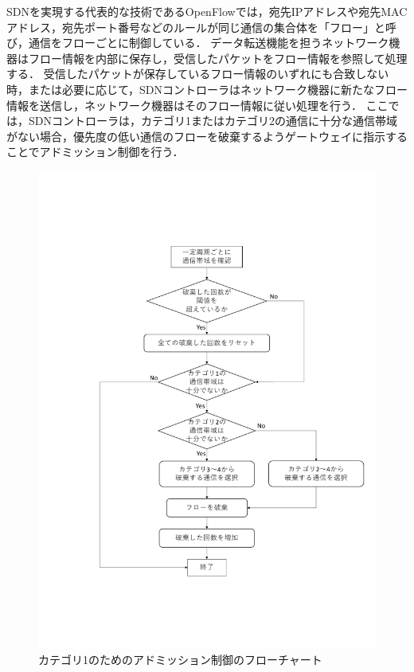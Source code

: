 \documentclass[a4paper,11pt,uplatex]{ujreport}
\begin{document}
  SDNを実現する代表的な技術であるOpenFlowでは，宛先IPアドレスや宛先MACアドレス，宛先ポート番号などのルールが同じ通信の集合体を「フロー」と呼び，通信をフローごとに制御している．
  データ転送機能を担うネットワーク機器はフロー情報を内部に保存し，受信したパケットをフロー情報を参照して処理する．
  受信したパケットが保存しているフロー情報のいずれにも合致しない時，または必要に応じて，SDNコントローラはネットワーク機器に新たなフロー情報を送信し，ネットワーク機器はそのフロー情報に従い処理を行う．
  ここでは，SDNコントローラは，カテゴリ1またはカテゴリ2の通信に十分な通信帯域がない場合，優先度の低い通信のフローを破棄するようゲートウェイに指示することでアドミッション制御を行う．\par

  \begin{figure}[!tb]
    \centering
    \includegraphics[width=\linewidth]{img/adomission_c1.pdf}
    \caption{カテゴリ1のためのアドミッション制御のフローチャート}
    \label{fig:adomission}
  \end{figure}
\end{document}
